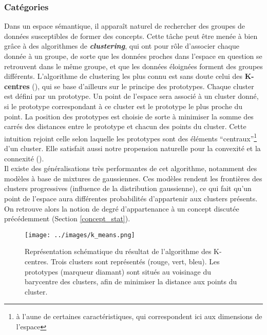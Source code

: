 \documentclass[french]{article}
\begin{document}
			\subsubsection{Catégories}
				Dans un espace sémantique, il apparaît naturel de rechercher des groupes de données susceptibles de former des concepts. Cette tâche peut être menée à bien grâce à des algorithmes de \textit{\textbf{clustering}}, qui ont pour rôle d'associer chaque donnée à un groupe, de sorte que les données proches dans l'espace en question se retrouvent dans le même groupe, et que les données éloignées forment des groupes différents. L'algorithme de clustering les plus connu est sans doute celui des \textbf{K-centres} (\cite{lloyd1982}), qui se base d'ailleurs sur le principe des prototypes. Chaque cluster est défini par un prototype. Un point de l'espace sera associé à un cluster donné, si le prototype correspondant à ce cluster est le prototype le plus proche du point. La position des prototypes est choisie de sorte à minimiser la somme des carrés des distances entre le prototype et chacun des points du cluster. Cette intuition rejoint celle selon laquelle les prototypes sont des éléments ``centraux''\footnote{à l'aune de certaines caractéristiques, qui correspondent ici aux dimensions de l'espace} d'un cluster. Elle satisfait aussi notre propension naturelle pour la convexité et la connexité (\cite{chemla2017}).\\
				
				Il existe des généralisations très performantes de cet algorithme, notamment des modèles à base de mixtures de gaussiennes. Ces modèles rendent les frontières des clusters progressives (influence de la distribution gaussienne), ce qui fait qu'un point de l'espace aura différentes probabilités d'appartenir aux clusters présents. On retrouve alors la notion de degré d'appartenance à un concept discutée précédemment (Section \ref{concept_stat}).
				\begin{figure}[H]
					\centering
					\texttt{[image: ../images/k\_means.png]}
					\caption{Représentation schématique du résultat de l'algorithme des K-centres. Trois clusters sont représentés (rouge, vert, bleu). Les prototypes (marqueur diamant) sont situés au voisinage du barycentre des clusters, afin de minimiser la distance aux points du cluster.}
				\end{figure}
				
			
				
\end{document}
